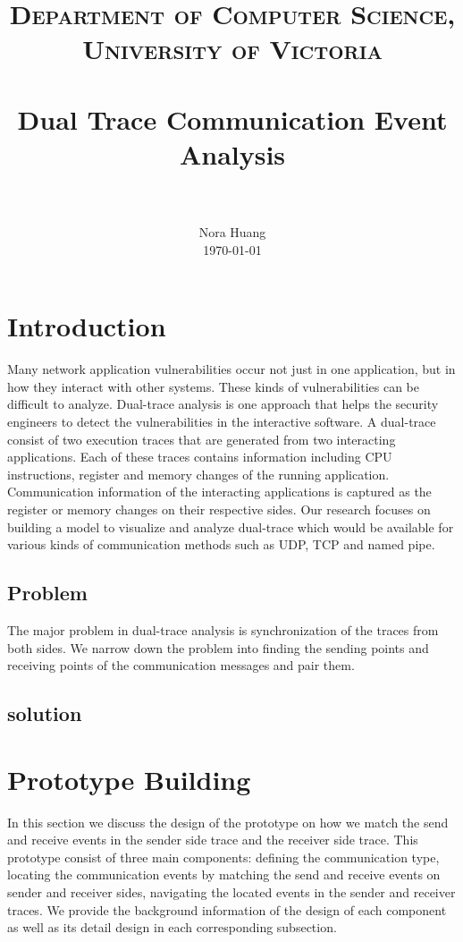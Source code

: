 \documentclass[paper=a4, fontsize=11pt]{scrartcl}
\title{
		\usefont{OT1}{bch}{b}{n}
		\normalfont \normalsize \textsc{Department of Computer Science,  University of Victoria} \\ [25pt]
		\horrule{0.5pt} \\[0.4cm]
		\huge Dual Trace Communication Event Analysis  \\
		\horrule{2pt} \\[0.5cm]
}
\author{
		\normalfont 								\normalsize
        Nora Huang\\[-3pt]		\normalsize
        \today
}
\date{}
\numberwithin{equation}{section}		%
\numberwithin{figure}{section}			%
\numberwithin{table}{section}				%
\begin{document}
\maketitle

\section{Introduction}
Many network application vulnerabilities occur not just in one application, but in how they interact with other systems. These kinds of vulnerabilities can be difficult to analyze. Dual-trace analysis is one approach that helps the security engineers to detect the vulnerabilities in the interactive software. A dual-trace consist of two execution traces that are generated from two interacting applications. Each of these traces contains information including CPU instructions, register and memory changes of the running application. Communication information of the interacting applications is captured as the register or memory changes on their respective sides. Our research focuses on building a model to visualize and analyze dual-trace which would be available for various kinds of communication methods such as UDP, TCP and named pipe. 

\subsection{Problem}
The major problem in dual-trace analysis is synchronization of the traces from both sides. We narrow down the problem into finding the sending points and receiving points of the communication messages and pair them. 

\subsection{solution}

\section{Prototype Building}
In this section we discuss the design of the prototype on how we match the send and receive events in the sender side trace and the receiver side trace. This prototype consist of three main components: defining the communication type, locating the communication events by matching the send and receive events on sender and receiver sides, navigating the located events in the sender and receiver traces. We provide the background information of the design of each component as well as its detail design in each corresponding subsection.
\end{document}
